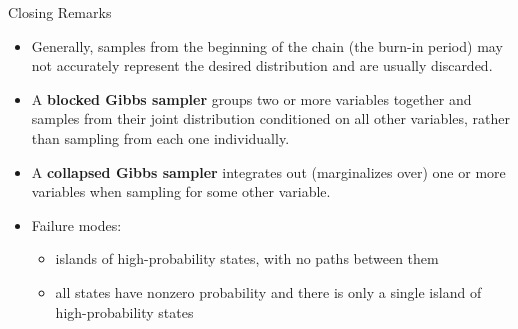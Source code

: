 \documentclass[
  ignorenonframetext,
]{beamer}
\providecommand{\tightlist}{%
  \setlength{\itemsep}{0pt}\setlength{\parskip}{0pt}}
\begin{document}
\begin{frame}{Closing Remarks}
\protect\hypertarget{closing-remarks}{}

\footnotesize

\begin{itemize}
\item
  Generally, samples from the beginning of the chain (the burn-in
  period) may not accurately represent the desired distribution and are
  usually discarded.
\item
  A \textbf{blocked Gibbs sampler} groups two or more variables together
  and samples from their joint distribution conditioned on all other
  variables, rather than sampling from each one individually.
\item
  A \textbf{collapsed Gibbs sampler} integrates out (marginalizes over)
  one or more variables when sampling for some other variable.
\item
  Failure modes:

  \begin{itemize}
  \tightlist
  \item
    islands of high-probability states, with no paths between them
  \item
    all states have nonzero probability and there is only a single
    island of high-probability states
  \end{itemize}
\end{itemize}

\end{frame}
\end{document}
